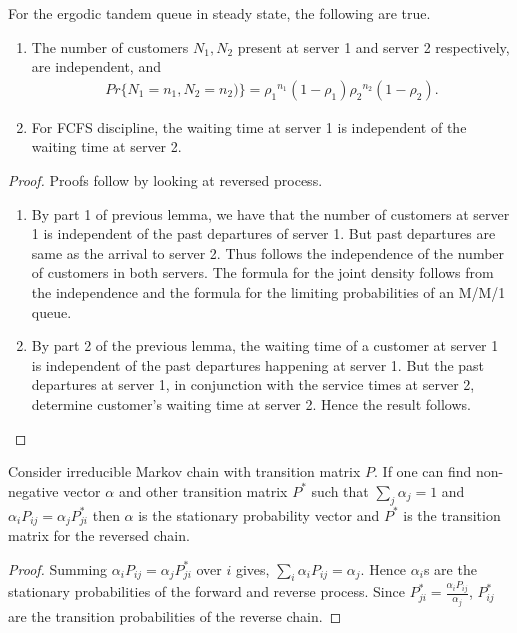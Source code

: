 \documentclass[a4paper,10pt,english]{article}
\begin{document}
\begin{thm}
For the ergodic tandem queue in steady state, the following are true.
\begin{enumerate}
\item The number of customers $N_1, N_2$ present at server 1 and server 2 respectively, are independent, and
\begin{align*}
Pr\{N_1 = n_1, N_2 = n_2)\}={\rho_1}^{n_1}(1-\rho_1){\rho_2}^{n_2}(1-\rho_2).
\end{align*}
\item For FCFS discipline, the waiting time at server 1 is independent of the waiting time at server 2.
\end{enumerate}
\end{thm}
\begin{proof}
Proofs follow by looking at reversed process.
\begin{enumerate}
\item By part 1 of previous lemma, we have that the number of customers at server 1 is independent of the past departures of server 1. But past departures are same as the arrival to server 2. Thus follows the independence of the number of customers in both servers. The formula for the joint density follows from the independence and the formula for the limiting probabilities of an M/M/1 queue. 
\item By part 2 of the previous lemma, the waiting time of a customer at server 1 is independent of the past departures happening at server 1. But the past departures at server 1, in conjunction with the service times at server 2, determine customer's waiting time at server 2. Hence the result follows.
\end{enumerate}
\end{proof}
\begin{thm}
Consider irreducible Markov chain with transition matrix $P$. If one can find non-negative vector $\alpha$ and other transition matrix $P^*$ such that $\sum_j \alpha_j =1$ and $\alpha_iP_{ij}=\alpha_jP^*_{ji}$ then $\alpha$ is the stationary probability vector and $P^*$ is the transition matrix for the reversed chain.
\end{thm}
\begin{proof}
Summing $\alpha_iP_{ij}=\alpha_jP_{ji}^*$ over $i$ gives, $\sum_{i}\alpha_iP_{ij}=\alpha_j$. Hence $\alpha_i$s are the stationary probabilities of the forward and reverse process. Since $P_{ji}^*=\frac{\alpha_iP_{ij}}{\alpha_j}$, $P_{ij}^*$ are the transition probabilities of the reverse chain.
\end{proof} 
\end{document}
